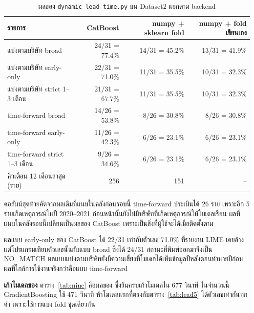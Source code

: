 \documentclass[12pt]{article}
\begin{document}
\begin{table}[H]
\centering
\small
\caption{ผลของ \texttt{dynamic\_lead\_time.py} บน Dataset2 แยกตาม backend}
\label{tab:dlt}
\begin{tabular}{@{}lrrr@{}}
\toprule
\textbf{รายการ} & \textbf{CatBoost} & \textbf{numpy + sklearn fold} & \textbf{numpy + fold เขียนเอง} \\
\midrule
แบ่งตามบริษัท broad & 24/31 = 77.4\% & 14/31 = 45.2\% & 13/31 = 41.9\% \\
แบ่งตามบริษัท early-only & 22/31 = 71.0\% & 11/31 = 35.5\% & 10/31 = 32.3\% \\
แบ่งตามบริษัท strict 1--3 เดือน & 21/31 = 67.7\% & 11/31 = 35.5\% & 10/31 = 32.3\% \\
time-forward broad & 14/26 = 53.8\% & 8/26 = 30.8\% & 8/26 = 30.8\% \\
time-forward early-only & 11/26 = 42.3\% & 6/26 = 23.1\% & 6/26 = 23.1\% \\
time-forward strict 1--3 เดือน & 9/26 = 34.6\% & 6/26 = 23.1\% & 6/26 = 23.1\% \\
คิวเตือน 12 เดือนล่าสุด (ราย) & 256 & 151 & -- \\
\bottomrule
\end{tabular}
\end{table}

\noindent คอลัมน์สุดท้ายคัดจากผลเดิมที่แนบในคลังก่อนรอบนี้ time-forward ประเมินได้ 26 ราย เพราะอีก 5 รายเกิดเหตุการณ์ในปี 2020--2021 ก่อนหน้านั้นยังไม่มีบริษัทที่เกิดเหตุการณ์ให้โมเดลเรียน ผลที่แนบในคลังรอบนี้เปลี่ยนเป็นผลของ CatBoost เพราะเป็นสิ่งที่ผู้ใช้จะได้เมื่อติดตั้งตาม 

ผลแบบ early-only ของ CatBoost ได้ 22/31 เท่ากับตัวเลข 71.0\% ที่รายงาน LIME เคยอ้าง แต่โปรแกรมเทียบตัวเลขนั้นกับแบบ broad ซึ่งได้ 24/31 สถานะที่พิมพ์ออกมาจึงเป็น NO\_MATCH ผลแบบแบ่งตามบริษัทยังมีความเสี่ยงที่โมเดลได้เห็นข้อมูลปีหลังตอนทำนายปีก่อน ผลที่ใกล้การใช้งานจริงกว่าคือแบบ time-forward

\textbf{เก้าโมเดลของ } ตาราง~\ref{tab:nine} คือผลของ  ซึ่งรันครบเก้าโมเดลใน 677 วินาที ในจำนวนนี้ GradientBoosting ใช้ 471 วินาที ห้าโมเดลแรกที่ตรงกับตาราง~\ref{tab:lead5} ได้ตัวเลขเท่ากันทุกค่า เพราะใช้การแบ่ง fold ชุดเดียวกัน
\end{document}
